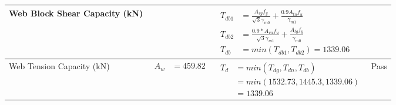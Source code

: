 \documentclass{article}%
\begin{document}
\begin{longtable}{|p{4cm}|p{6cm}|p{5.5cm}|p{1.5cm}|}
\hline%
Web Block Shear Capacity (kN)&&$\begin{aligned}T_{db1} &= \frac{A_{vg} f_{y}}{\sqrt{3} \gamma_{m0}} + \frac{0.9 A_{tn} f_{u}}{\gamma_{m1}}\\ T_{db2} &= \frac{0.9*A_{vn} f_{u}}{\sqrt{3} \gamma_{m1}} + \frac{A_{tg} f_{y}}{\gamma_{m0}}\\ T_{db} &= min(T_{db1}, T_{db2})= 1339.06\end{aligned}$&\\%
\hline%
Web Tension Capacity (kN)&$\begin{aligned} A_w &=459.82\end{aligned}$&$\begin{aligned} T_d &= min(T_{dg},T_{dn},T_{db})\\ &= min(1532.73,1445.3,1339.06)\\ &=1339.06\end{aligned}$&Pass\\%
\hline%
\end{longtable}

%
\newpage%
\end{document}

